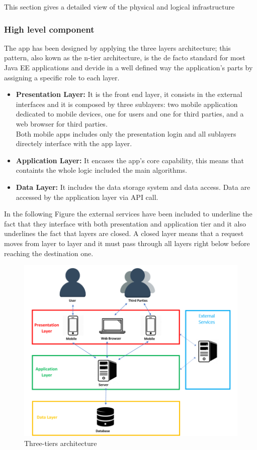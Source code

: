 This section gives a detailed view of the physical and logical infrastructure

\subsubsection{High level component}
The app has been designed by applying the three layers architecture; this pattern, also kown as the n-tier architecture, is the de facto standard for most Java EE applications and devide in a well defined way the application's parts  by assigning a specific role to each layer.
\begin{itemize}
	\item \textbf{Presentation Layer:} It is the front end layer, it consists in the external interfaces and it is composed by three 			sublayers: two mobile application  dedicated to mobile devices, one for users and one for third parties, and a web browser for 			third parties.\\ Both mobile apps  includes only the presentation login and all sublayers directely interface with the app layer.
	\item \textbf{Application Layer:} It encases the app's core capability, this means that containts the whole logic included the main 		algorithms. 
	\item \textbf{Data Layer:} It includes the data storage system and data access. Data are accessed by the application layer 			via API call.
\end{itemize}In the following Figure the external services have been included to underline the fact that they interface with both presentation and application tier and it also underlines the fact that layers are closed. A closed layer means that a request moves from layer to layer and it  must pass through all layers right below before reaching the destination one.

\begin{figure}[h!]
	\includegraphics[width=1.0\textwidth]{./pictures/design_arch.png}\par
	\caption{Three-tiers architecture}
\end{figure}
\FloatBarrier

